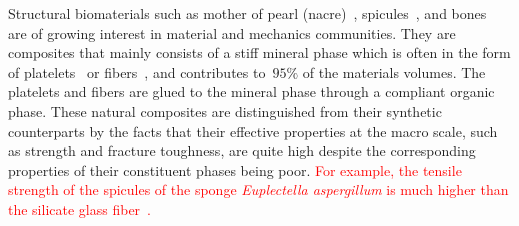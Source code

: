 \documentclass[preprint,12pt,times]{elsarticle}
\numberwithin{equation}{section}
\renewcommand{\>}{$\Rightarrow$}
\begin{document}

Structural biomaterials such as mother of pearl (nacre)~\cite{jackson1988mechanical}, spicules~\cite{monn2015new}, and bones~\cite{wegst2015bioinspired} are of growing interest in material and mechanics communities.
%
They are composites that mainly consists of a stiff mineral phase which is often in the form of platelets~\cite{currey1977mechanical, meyers2008biological, espinosa2011tablet} or fibers~\cite{Aizenberg2005, zhang2011structure, li2015hierarchical}, and contributes to~$95\%$ of the materials volumes.
%
The platelets and fibers are glued to the mineral phase through a compliant organic phase.
%
These natural composites are distinguished from their synthetic counterparts by the facts that their effective properties at the macro scale, such as strength and fracture toughness, are quite high despite the corresponding properties of their constituent phases being poor.
%
\textcolor{red}{For example, the tensile strength of the spicules of the sponge \textit{Euplectella aspergillum} is much higher than the silicate glass fiber~\cite{walter2007mechanisms}.}
%
\end{document}
